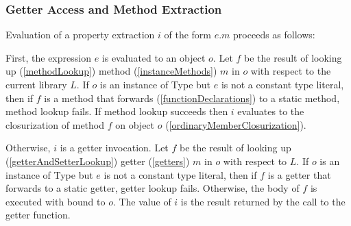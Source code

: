 \documentclass{article}
\newcommand{\code}[1]{{\sf #1}}
\begin{document}
\subsubsection{Getter Access and Method Extraction}

\LMHash{}
Evaluation of a property extraction $i$ of the form $e.m$ proceeds as follows:

\LMHash{}
First, the expression $e$ is evaluated to an object $o$. Let $f$ be the result of looking up (\ref{methodLookup}) method  (\ref{instanceMethods}) $m$ in $o$ with respect to the current library $L$.  If $o$ is an instance of \code{Type} but $e$ is not a constant type literal, then if $f$ is a method that forwards (\ref{functionDeclarations}) to a static method,  method lookup fails. If method lookup succeeds then $i$ evaluates to the closurization of method $f$ on object $o$ (\ref{ordinaryMemberClosurization}).


\LMHash{}
Otherwise, $i$ is a getter invocation.  Let $f$ be the result of looking up
(\ref{getterAndSetterLookup}) getter (\ref{getters}) $m$ in $o$  with respect to $L$. If $o$ is an instance of \code{Type} but $e$ is not a constant type literal, then if $f$ is a getter that forwards  to a static getter,  getter lookup fails. Otherwise, the body of $f$ is executed with \THIS{} bound to $o$.  The value of $i$ is the result returned by the call to the getter function.
\end{document}

